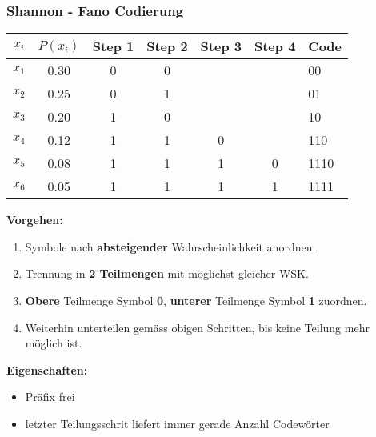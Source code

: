 \subsubsection{Shannon - Fano Codierung }
\begin{multicols}{2}
	\begin{tabular}{|c|c|c|c|c|c|l|}
		\hline
		$x_i$	& $P(x_i)$ 	& Step 1	& Step 2	& Step 3 	& Step 4 	& Code \\
		\hline
		$x_1$	& 0.30		& 0			& 0			& 			&			& 00 \\
		\cline{4-4}
		$x_2$	& 0.25		& 0			& 1			& 			& 			& 01 \\
		\cline{3-4}
		$x_3$	& 0.20		& 1			& 0			& 			& 			& 10 \\
		\cline{4-5}
		$x_4$	& 0.12		& 1			& 1			& 0			& 			& 110 \\
		\cline{5-6}
		$x_5$	& 0.08		& 1			& 1			& 1			& 0			& 1110 \\
		\cline{6-6}		
		$x_6$	& 0.05		& 1			& 1			& 1			& 1			& 1111 \\
		\hline 
	\end{tabular}
	
	\columnbreak
	
	\textbf{Vorgehen:}
	\begin{enumerate}
		\item Symbole nach \textbf{absteigender} Wahrscheinlichkeit anordnen.
		\item Trennung in \textbf{2 Teilmengen} mit möglichst gleicher WSK.
		\item \textbf{Obere} Teilmenge Symbol \textbf{0}, \textbf{unterer} Teilmenge Symbol \textbf{1}
		  zuordnen.
		\item Weiterhin unterteilen gemäss obigen Schritten, bis keine Teilung mehr möglich ist.
	\end{enumerate}
	
	\textbf{Eigenschaften:}
	\begin{itemize}
  		\item Präfix frei
  		\item letzter Teilungsschrit liefert immer gerade Anzahl Codewörter 
	\end{itemize}
\end{multicols}



